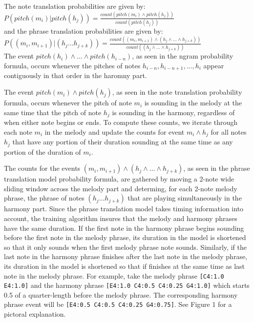 \documentclass{sig-alternate}
\begin{document}
The note translation probabilities are given by:\\

$P(pitch(m_{i}) | pitch(h_{j})) = \frac{count(pitch(m_{i}) \wedge pitch(h_{j}))}{count(pitch(h_{j}))}$\\

and the phrase translation probabilities are given by:\\

$P((m_{i}, m_{i+1}) | (h_{j} \ldots h_{j+k})) = \frac{count((m_{i}, m_{i+1}) \wedge (h_{j} \wedge \ldots \wedge h_{j+k}))}{count((h_{j} \wedge \ldots \wedge h_{j+k}))}$\\

The event $pitch(h_{i}) \wedge ... \wedge pitch(h_{i - n})$, as seen in the ngram probability formula, occurs whenever the pitches of notes $h_{i - n}, h_{i - n + 1}, ..., h_{i}$ appear contiguously in that order in the haromny part. 

The event $pitch(m_{i}) \wedge pitch(h_{j})$, as seen in the note translation probability formula, occurs whenever the pitch of note $m_{i}$ is sounding in the melody at the same time that the pitch of note $h_{j}$ is sounding in the harmony, regardless of when either note begins or ends. To compute these counts, we iterate through each note $m_{i}$ in the melody and update the counts for event $m_{i} \wedge h_{j}$ for all notes $h_{j}$ that have any portion of their duration sounding at the same time as any portion of the duration of $m_{i}$.

The counts for the events $(m_{i}, m_{i+1}) \wedge (h_{j} \wedge \ldots \wedge h_{j+k})$, as seen in the phrase translation model probability formula, are gathered by moving a 2-note wide sliding window across the melody part
and determing, for each 2-note melody phrase, the phrase of notes $(h_{j} \ldots h_{j + k})$ that are playing simultaneously in the harmony part. Since the phrase translation model takes timing information into account, the training algorithm insures that the melody and harmony phrases have the same duration. If the first note in the harmony phrase begins sounding before the first note in the melody phrase, its duration in the model is shortened so that it only sounds when the first melody phrase note sounds. Similarly, if the last note in the harmony phrase finishes after the last note in the melody phrase, its duration in the model is shortened so that if finishes at the same time as last note in the melody phrase. For example, take the melody phrase \texttt{[C4:1.0 E4:1.0]} and the harmony phrase \texttt{[E4:1.0 C4:0.5 C4:0.25 G4:1.0]} which starts 0.5 of a quarter-length before the melody phrase. The corresponding harmony phrase event will be \texttt{[E4:0.5 C4:0.5 C4:0.25 G4:0.75]}. See Figure 1 for a pictoral explanation.
\end{document}
